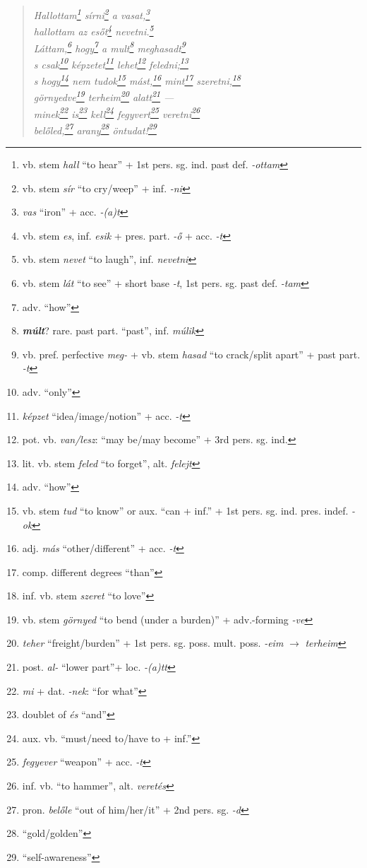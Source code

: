 \documentclass[a4paper,12pt,twoside,final]{book}
\begin{document}
\begin{verse}%
  \it
  Hallottam\footnote{vb. stem \emph{hall} ``to hear'' + 1st
  pers. sg. ind. past def. \emph{-ottam}} sírni\footnote{vb. stem
  \emph{sír} ``to cry/weep'' + inf. \emph{-ni}} a
  vasat,\footnote{\emph{vas} ``iron'' + acc. \emph{-(a)t}} \\
  hallottam az esőt\footnote{vb. stem \emph{es}, inf. \emph{esik} +
  pres. part. \emph{-ő} + acc. \emph{-t}} nevetni.\footnote{vb. stem
  \emph{nevet} ``to laugh'', inf. \emph{nevetni}} \\
  Láttam,\footnote{vb. stem \emph{lát} ``to see'' +
  short base \emph{-t}, 1st pers. sg. past def. \emph{-tam}}
  hogy\footnote{adv. ``how''} a mult\footnote{\textbf{\emph{múlt}}?
  rare. past part. ``past'', inf. \emph{múlik}}
  meghasadt\footnote{vb. pref. perfective \emph{meg-} + vb. stem
  \emph{hasad} ``to crack/split apart'' + past
  part. \emph{-t}} \\
  s csak\footnote{adv. ``only''} képzetet\footnote{\emph{képzet}
  ``idea/image/notion'' + acc. \emph{-t}}
  lehet\footnote{pot. vb. \emph{van/lesz}:
  ``may be/may become'' + 3rd pers. sg. ind.}
  feledni;\footnote{lit. vb. stem \emph{feled} ``to forget'', alt. \emph{felejt}} \\
  s hogy\footnote{adv. ``how''} nem tudok\footnote{vb. stem
  \emph{tud} ``to know'' or aux. ``can + inf.'' + 1st
  pers. sg. ind. pres. indef. \emph{-ok}}
  mást,\footnote{adj. \emph{más} ``other/different'' + acc. \emph{-t}}
  mint\footnote{comp. different degrees ``than''}
  szeretni,\footnote{inf. vb. stem \emph{szeret} ``to love''} \\
  görnyedve\footnote{vb. stem \emph{görnyed} ``to bend (under a
  burden)'' + adv.-forming \emph{-ve}} terheim\footnote{\emph{teher}
  ``freight/burden'' + 1st
  pers. sg. poss. mult. poss. \emph{-eim} $\rightarrow$ \emph{terheim}}
  alatt\footnote{post. \emph{al-} ``lower part''+ loc. \emph{-(a)tt}}
  --- \\
  minek\footnote{\emph{mi} + dat. \emph{-nek}: ``for what''}
  is\footnote{doublet of \emph{és} ``and''}
  kell\footnote{aux. vb. ``must/need to/have to + inf.''}
  fegyvert\footnote{\emph{fegyever} ``weapon'' + acc. \emph{-t}}
    veretni\footnote{inf. vb. ``to hammer'', alt. \emph{veretés}} \\
  belőled,\footnote{pron. \emph{belőle} ``out of him/her/it'' + 2nd
  pers. sg. \emph{-d}} arany\footnote{``gold/golden''}
  öntudat!\footnote{``self-awareness''}
\end{verse}
\end{document}
